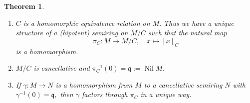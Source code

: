 \documentclass [12pt,a4paper,reqno]{amsart}
\newtheorem{thm}{Theorem} [section]
\begin{document}
\begin{thm}\label{thm2.1}\quad {}

\begin{enumerate}
\item[a)] $C$ is a homomorphic equivalence relation on $M.$ Thus
we have a unique structure of a (bipotent) semiring on $M/C$ such
that the natural map
$$\pi_C: M\to M/C,\quad x\mapsto [x]_C$$
is a homomorphism.

\item[b)] $M/C$ is cancellative and $\pi_C^{-1}(0)={\mathfrak q}
:={\operatorname{Nil}} M.$

\item[c)] If ${\gamma} : M\to N$ is a homomorphism from $M$ to a
cancellative semiring $N$ with ${\gamma} ^{-1}(0)={\mathfrak q},$ then ${\gamma} $
factors through $\pi_C$ in a unique way.
\end{enumerate}
\end{thm}
\end{document}
